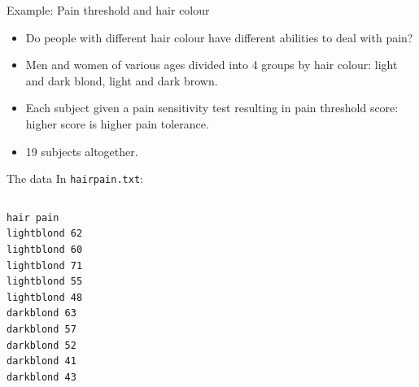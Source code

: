 \documentclass[
  ignorenonframetext,
]{beamer}
\begin{document}
\begin{frame}{Example: Pain threshold and hair colour}
\protect\hypertarget{example-pain-threshold-and-hair-colour}{}
\begin{itemize}
\item
  Do people with different hair colour have different abilities to deal
  with pain?
\item
  Men and women of various ages divided into 4 groups by hair colour:
  light and dark blond, light and dark brown.
\item
  Each subject given a pain sensitivity test resulting in pain threshold
  score: higher score is higher pain tolerance.
\item
  19 subjects altogether.
\end{itemize}
\end{frame}

\begin{frame}[fragile]{The data}
\protect\hypertarget{the-data}{}
In \texttt{hairpain.txt}:

\begin{columns}[T]
\begin{column}{0.5\textwidth}
\begin{verbatim}
hair pain
lightblond 62
lightblond 60
lightblond 71
lightblond 55
lightblond 48
darkblond 63
darkblond 57
darkblond 52
darkblond 41
darkblond 43
\end{verbatim}
\end{column}

\end{columns}
\end{frame}
\end{document}
